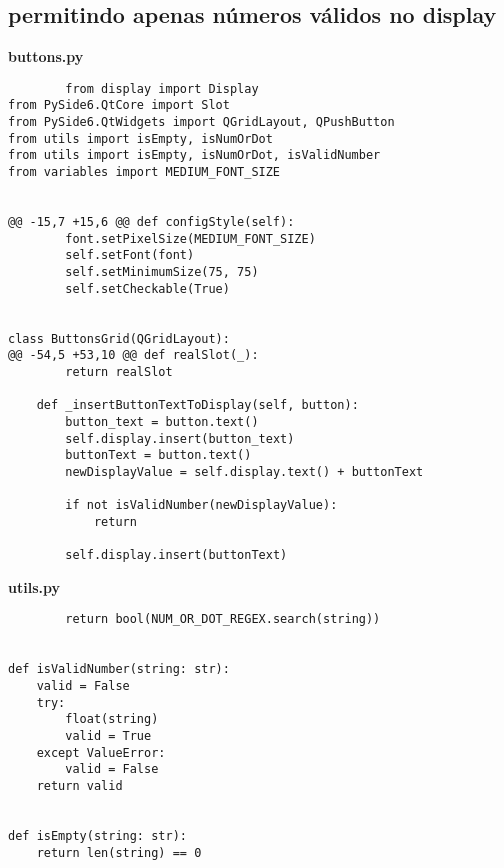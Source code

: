 \documentclass[12pt,a4paper]{article}
\begin{document}
    \subsection{permitindo apenas números válidos no display}
    \textbf{buttons.py}
    \begin{lstlisting}
        from display import Display
from PySide6.QtCore import Slot
from PySide6.QtWidgets import QGridLayout, QPushButton
from utils import isEmpty, isNumOrDot
from utils import isEmpty, isNumOrDot, isValidNumber
from variables import MEDIUM_FONT_SIZE


@@ -15,7 +15,6 @@ def configStyle(self):
        font.setPixelSize(MEDIUM_FONT_SIZE)
        self.setFont(font)
        self.setMinimumSize(75, 75)
        self.setCheckable(True)


class ButtonsGrid(QGridLayout):
@@ -54,5 +53,10 @@ def realSlot(_):
        return realSlot

    def _insertButtonTextToDisplay(self, button):
        button_text = button.text()
        self.display.insert(button_text)
        buttonText = button.text()
        newDisplayValue = self.display.text() + buttonText

        if not isValidNumber(newDisplayValue):
            return

        self.display.insert(buttonText)
    \end{lstlisting}

    \textbf{utils.py}
    \begin{lstlisting}
        return bool(NUM_OR_DOT_REGEX.search(string))


def isValidNumber(string: str):
    valid = False
    try:
        float(string)
        valid = True
    except ValueError:
        valid = False
    return valid


def isEmpty(string: str):
    return len(string) == 0
    \end{lstlisting}
\end{document}
